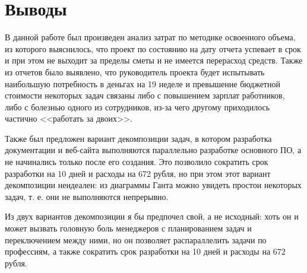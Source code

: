 \chapter{Выводы}

В данной работе был произведен анализ затрат по методике освоенного объема, из которого выяснилось, что проект по состоянию на дату отчета успевает в срок и при этом не выходит за пределы сметы и не имеется перерасход средств. Также из отчетов было выявлено, что руководитель проекта будет испытывать наибольшую потребность в деньгах на 19 неделе и превышение бюджетной стоимости некоторых задач связаны либо с повышением зарплат работников, либо с болезнью одного из сотрудников, из-за чего другому приходилось частично <<работать за двоих>>.

Также был предложен вариант декомпозиции задач, в котором разработка документации и веб-сайта выполняются параллельно разработке основного ПО, а не начинались только после его создания. Это позволило сократить срок разработки на 10 дней и расходы на 672 рубля, но при этом этот вариант декомпозиции неидеален: из диаграммы Ганта можно увидеть простои некоторых задач, т. е. они не выполняются непрерывно.

Из двух вариантов декомпозиции я бы предпочел свой, а не исходный: хоть он и может вызвать головную боль менеджеров с планированием задач и переключением между ними, но он позволяет распараллелить задачи по профессиям, а также сократить срок разработки на 10 дней и расходы на 672 рубля.